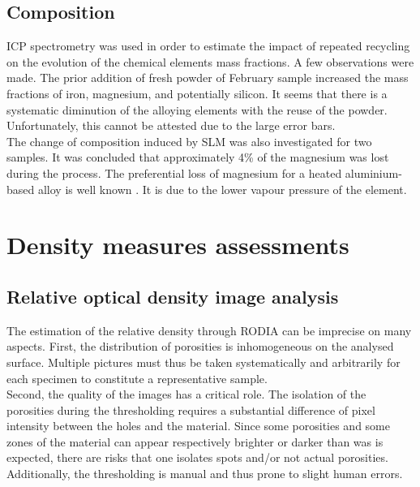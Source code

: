 \subsection{Composition}

ICP spectrometry was used in order to estimate the impact of repeated recycling on the evolution of the chemical elements mass fractions. A few observations were made. The prior addition of fresh powder of February sample increased the mass fractions of iron, magnesium, and potentially silicon. It seems that there is a systematic diminution of the alloying elements with the reuse of the powder. Unfortunately, this cannot be attested due to the large error bars.\\

The change of composition induced by SLM was also investigated for two samples. It was concluded that approximately 4\% of the magnesium was lost during the process. The preferential loss of magnesium for a heated aluminium-based alloy is well known \parencite{HIDVEGI197739}. It is due to the lower vapour pressure of the element. %
\section{Density measures assessments}
\label{DDMA}



\subsection{Relative optical density image analysis}
\label{DRODIA}

The estimation of the relative density through RODIA can be imprecise on many aspects. First, the distribution of porosities is inhomogeneous on the analysed surface. Multiple pictures must thus be taken systematically and arbitrarily for each specimen to constitute a representative sample.\\

Second, the quality of the images has a critical role. The isolation of the porosities during the thresholding requires a substantial difference of pixel intensity between the holes and the material. Since some porosities and some zones of the material can appear respectively brighter or darker than was is expected, there are risks that one isolates spots and/or not actual porosities. Additionally, the thresholding is manual and thus prone to slight human errors. \\

